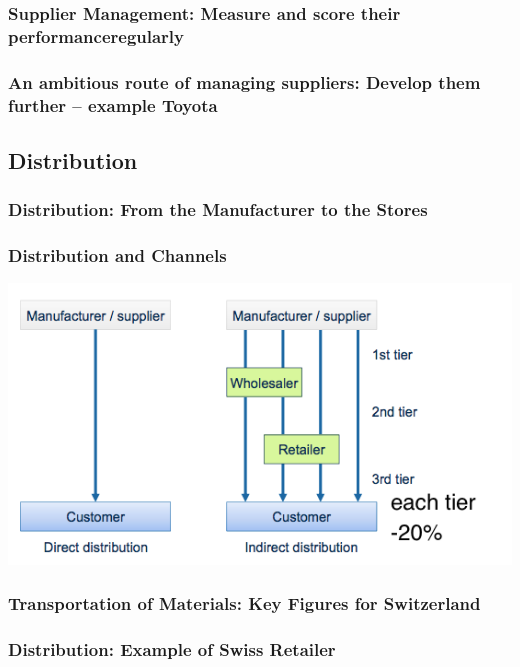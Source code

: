 \subsubsection{Supplier Management: Measure and score their performanceregularly}
\subsubsection{An ambitious route of managing suppliers: Develop them further – example Toyota}
\subsection{Distribution}
\subsubsection{Distribution: From the Manufacturer to the Stores}
\subsubsection{Distribution and Channels}
\includegraphics[width=1\textwidth]{W06/distributionandchannels}
\subsubsection{Transportation of Materials: Key Figures for Switzerland}
\subsubsection{Distribution: Example of Swiss Retailer}
